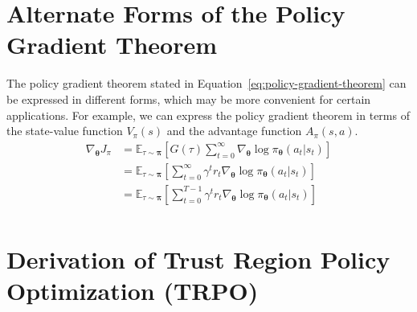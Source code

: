 \documentclass[12pt]{report}
\theoremstyle{definition}
\theoremstyle{remark}
\begin{document}
\begin{appendices}
\section{Alternate Forms of the Policy Gradient Theorem}
The policy gradient theorem stated in Equation~\ref{eq:policy-gradient-theorem} can be expressed in different forms, which may be more convenient for certain applications. For example, we can express the policy gradient theorem in terms of the state-value function $V_\pi(s)$ and the advantage function $A_\pi(s, a)$.
\begin{align}
    \nabla_{\boldsymbol{\theta}} J_\pi &= \mathbb{E}_{\tau\sim\boldsymbol{\pi}}\left[G(\tau) \sum_{t=0}^{\infty} \nabla_{\boldsymbol{\theta}} \log \pi_{\boldsymbol{\theta}}(a_t | s_t)\right] \\
    &= \mathbb{E}_{\tau\sim\boldsymbol{\pi}}\left[\sum_{t=0}^{\infty} \gamma^t r_t \nabla_{\boldsymbol{\theta}} \log \pi_{\boldsymbol{\theta}}(a_t | s_t)\right] \\
    &= \mathbb{E}_{\tau\sim\boldsymbol{\pi}}\left[\sum_{t=0}^{T-1} \gamma^t r_t \nabla_{\boldsymbol{\theta}} \log \pi_{\boldsymbol{\theta}}(a_t | s_t)\right] \\
\end{align}



\section{Derivation of Trust Region Policy Optimization (TRPO)}
\label{sec:trpo-derivation}
\end{appendices}


\nocite{*} %

\printglossaries

\printbibliography
{}
\end{document}
